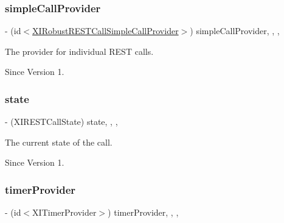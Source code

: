 \subsubsection{\texorpdfstring{simple\+Call\+Provider}{simpleCallProvider}}
{\footnotesize\ttfamily -\/ (id$<$\hyperlink{protocol_x_i_robust_r_e_s_t_call_simple_call_provider-p}{X\+I\+Robust\+R\+E\+S\+T\+Call\+Simple\+Call\+Provider}$>$) simple\+Call\+Provider\hspace{0.3cm}{\ttfamily [read]}, {\ttfamily [write]}, {\ttfamily [nonatomic]}, {\ttfamily [weak]}}



The provider for individual R\+E\+ST calls. 

\begin{DoxySince}{Since}
Version 1. 
\end{DoxySince}
\hypertarget{category_x_i_robust_r_e_s_t_call_07_08_abf42c4db39f91e60f97a9e21216f463a}{}\label{category_x_i_robust_r_e_s_t_call_07_08_abf42c4db39f91e60f97a9e21216f463a} 
\subsubsection{\texorpdfstring{state}{state}}
{\footnotesize\ttfamily -\/ (X\+I\+R\+E\+S\+T\+Call\+State) state\hspace{0.3cm}{\ttfamily [read]}, {\ttfamily [write]}, {\ttfamily [nonatomic]}, {\ttfamily [assign]}}



The current state of the call. 

\begin{DoxySince}{Since}
Version 1. 
\end{DoxySince}
\hypertarget{category_x_i_robust_r_e_s_t_call_07_08_a5ee90c38f5c704c9a0eb8b4131798f43}{}\label{category_x_i_robust_r_e_s_t_call_07_08_a5ee90c38f5c704c9a0eb8b4131798f43} 
\subsubsection{\texorpdfstring{timer\+Provider}{timerProvider}}
{\footnotesize\ttfamily -\/ (id$<$X\+I\+Timer\+Provider$>$) timer\+Provider\hspace{0.3cm}{\ttfamily [read]}, {\ttfamily [write]}, {\ttfamily [nonatomic]}, {\ttfamily [strong]}}



